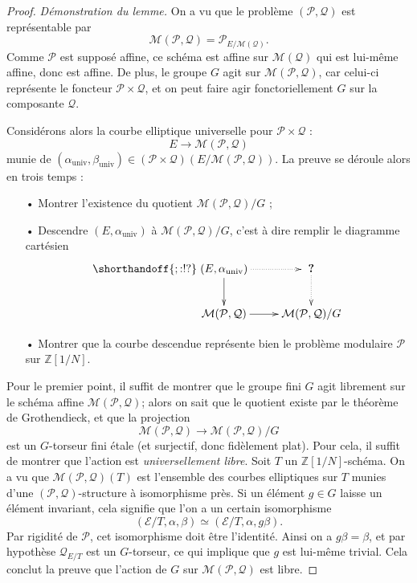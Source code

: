 \documentclass[11pt,a4paper]{article}
\newcommand{\Z}{\mathbb{Z}}
\newcommand{\E}{\mathcal{E}}
\renewcommand{\Pr}{\mathcal{P}}
\newcommand{\Qr}{\mathcal{Q}}
\newcommand{\M}{\mathcal{M}}
\newcommand{\vers}{\longrightarrow}
\theoremstyle{definition}
\begin{document}
\begin{proof}
\emph{Démonstration du lemme.} On a vu que le problème $(\Pr, \Qr)$ est représentable par
$$\M(\Pr, \Qr) = \Pr_{E/\M(\Qr)}.$$
Comme $\Pr$ est supposé affine, ce schéma est affine sur $\M(\Qr)$ qui est lui-même affine, donc est affine. De plus, le groupe $G$ agit sur $\M(\Pr, \Qr)$, car celui-ci représente le foncteur $\Pr\times\Qr$, et on peut faire agir fonctoriellement $G$ sur la composante $\Qr$.

\newcommand{\univ}{\mathrm{univ}}

Considérons alors la courbe elliptique universelle pour $\Pr\times\Qr$ :
$$E \vers \M(\Pr,\Qr)$$
munie de $(\alpha_{\univ}, \beta_{\univ}) \in (\Pr\times\Qr)(E/\M(\Pr,\Qr)).$ La preuve se déroule alors en trois temps :
\begin{itemize}
\item[•] Montrer l'existence du quotient $\M(\Pr,\Qr)/G$ ;
\item[•] Descendre $(E, \alpha_{\univ})$ à $\M(\Pr,\Qr)/G$, c'est à dire remplir le diagramme cartésien
$$
\shorthandoff{;:!?}
\xymatrix {
(E,\alpha_{\univ}) \ar[d] \ar@{.>}[r] &\ \textbf{?}\ \ar@{.>}[d] \\
 \M(\Pr,\Qr) \ar[r] & \M(\Pr,\Qr)/G
}
$$
\item[•] Montrer que la courbe descendue représente bien le problème modulaire $\Pr$ sur $\Z[1/N]$.
\end{itemize}

Pour le premier point, il suffit de montrer que le groupe fini $G$ agit librement sur le schéma affine $\M(\Pr,\Qr)$; alors on sait que le quotient existe par le théorème de Grothendieck, et que la projection
$$\M(\Pr,\Qr)\vers \M(\Pr,\Qr)/G$$
est un $G$-torseur fini étale (et surjectif, donc fidèlement plat). Pour cela, il suffit de montrer que l'action est \emph{universellement libre}. Soit $T$ un $\Z[1/N]$-schéma. On a vu que $\M(\Pr, \Qr)(T)$ est l'ensemble des courbes elliptiques sur $T$ munies d'une $(\Pr,\Qr)$-structure à isomorphisme près. Si un élément $g\in G$ laisse un élément invariant, cela signifie que l'on a un certain isomorphisme
$$(\E/T, \alpha, \beta) \simeq (\E/T, \alpha, g\beta).$$
Par rigidité de $\Pr$, cet isomorphisme doit être l'identité. Ainsi on a $g\beta = \beta$, et par hypothèse $\Qr_{E/T}$ est un $G$-torseur, ce qui implique que $g$ est lui-même trivial. Cela conclut la preuve que l'action de $G$ sur $\M(\Pr,\Qr)$ est libre.


\end{proof}
\end{document}
